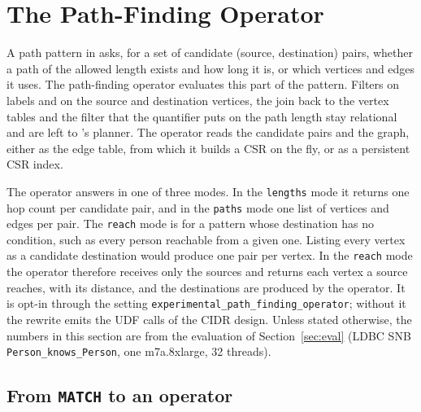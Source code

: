 \section{The Path-Finding Operator}
\label{sec:operator}


A path pattern in \sqlpgq asks, for a set of candidate (source, destination) pairs, whether a path of the allowed
length exists and how long it is, or which vertices and edges it uses. The path-finding operator evaluates this part of
the pattern. Filters on labels and on the source and destination vertices, the join back to the vertex tables and the
filter that the quantifier puts on the path length stay relational and are left to \duckdb's planner. The operator reads the candidate pairs and
the graph, either as the edge table, from which it builds a CSR on the fly, or as a persistent CSR index.

The operator answers in one of three modes. In the \texttt{lengths} mode it returns one hop count per candidate pair,
and in the \texttt{paths} mode one list of vertices and edges per pair. The \texttt{reach} mode is for a pattern whose
destination has no condition, such as every person reachable from a given one. Listing every vertex as a candidate
destination would produce one pair per vertex. In the \texttt{reach} mode the operator therefore receives only the sources and
returns each vertex a source reaches, with its distance, and the destinations are produced by the operator. It is opt-in through the setting \texttt{experimental\_path\_finding\_operator}; without it the
rewrite emits the UDF calls of the CIDR design. Unless stated otherwise, the numbers in this section are from the
evaluation of Section~\ref{sec:eval} (LDBC SNB \texttt{Person\_knows\_Person}, one m7a.8xlarge, 32 threads).

\subsection{From \texttt{MATCH} to an operator}
\label{sec:planner}

